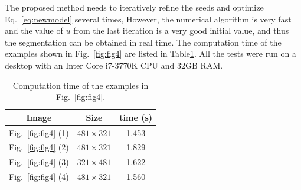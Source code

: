 \documentclass{article}
\begin{document}
%
The proposed method needs to iteratively refine the seeds and optimize Eq.~\eqref{eq:newmodel} several times, However, the numerical algorithm is very fast and the value of $u$ from the last iteration is a very good initial value, and thus the segmentation can be obtained in real time. The computation time of the examples shown in Fig.~\ref{fig:fig4} are listed in Table\ref{table:time}. All the tests were run on a desktop with an Inter Core i7-3770K CPU and 32GB RAM.
\vspace{-3mm}
\begin{table}[!htb]
    \begin{center}
        \begin{tabular}{|c|c|c|}
        \hline
        Image & Size & time (s)\\
        \hline \hline \hline
        Fig.~\ref{fig:fig4} (1) & $481\times321$ &  1.453\\
        Fig.~\ref{fig:fig4} (2) & $481\times321$ &  1.829\\
        Fig.~\ref{fig:fig4} (3) & $321\times481$ &  1.622\\
        Fig.~\ref{fig:fig4} (4) & $481\times321$ &  1.560\\
        \hline
        \end{tabular}
    \end{center}
    \vspace{-2em}
    \caption{\small{Computation time of the examples in Fig.~\ref{fig:fig4}.}}
    \label{table:time}
\end{table}
%
\vspace{-8mm}
\end{document}
